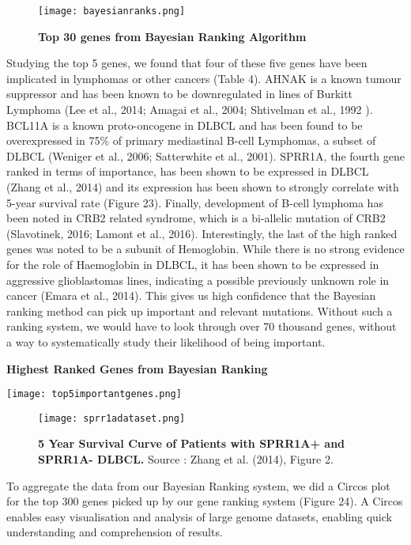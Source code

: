 \documentclass{article}
\begin{document}
\begin{figure}[H]
\texttt{[image: bayesianranks.png]}
\caption{\textbf{Top 30 genes from Bayesian Ranking Algorithm}}
\centering
\end{figure}

Studying the top 5 genes, we found that four of these five genes have been implicated in lymphomas or other cancers (Table 4). AHNAK is a known tumour suppressor and has been known to be downregulated in lines of Burkitt Lymphoma (Lee et al., 2014; Amagai et al., 2004; Shtivelman et al., 1992
). BCL11A is a known proto-oncogene in DLBCL and has been found to be overexpressed in 75\% of primary mediastinal B-cell Lymphomas, a subset of DLBCL (Weniger et al., 2006; Satterwhite et al., 2001). SPRR1A, the fourth gene ranked in terms of importance, has been shown to be expressed in DLBCL (Zhang et al., 2014) and its expression has been shown to strongly correlate with 5-year survival rate (Figure 23). Finally, development of B-cell lymphoma has been noted in CRB2 related syndrome, which is a bi-allelic mutation of CRB2 (Slavotinek, 2016; Lamont et al., 2016). Interestingly, the last of the high ranked genes was noted to be a subunit of Hemoglobin. While there is no strong evidence for the role of Haemoglobin in DLBCL, it has been shown to be expressed in aggressive glioblastomas lines, indicating a possible previously unknown role in cancer (Emara et al., 2014). This gives us high confidence that the Bayesian ranking method can pick up important and relevant mutations. Without such a ranking system, we would have to look through over 70 thousand genes, without a way to systematically study their likelihood of being important. 

\begin{table}[H]
\caption{\textbf{Highest Ranked Genes from Bayesian Ranking}}
\texttt{[image: top5importantgenes.png]}
\centering
\end{table}

\begin{figure}[H]
\centering
\texttt{[image: sprr1adataset.png]}
\caption{ \textbf{5 Year Survival Curve of Patients with SPRR1A+ and SPRR1A-  DLBCL.} Source : Zhang et al. (2014), Figure 2.}
\end{figure}


To aggregate the data from our Bayesian Ranking system, we did a Circos plot for the top 300 genes picked up by our gene ranking system (Figure 24). A Circos enables easy visualisation and analysis of large genome datasets, enabling quick understanding and comprehension of results. 
\end{document}
